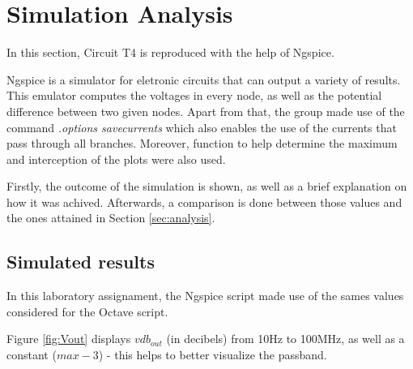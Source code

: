 
\section{Simulation Analysis}
\label{sec:simulation}



In this section, Circuit T4 is reproduced with the help of Ngspice.

Ngspice is a simulator for eletronic circuits that can output a variety of results.
This emulator computes the voltages in every node, as well as the potential difference
between two given nodes. Apart from that, the group made use of the command
{\em .options savecurrents} which also enables the use of the currents that pass
through all branches. Moreover, function to help determine the maximum and interception
of the plots were also used.

Firstly, the outcome of the simulation is shown, as well as a brief explanation
on how it was achived. Afterwards, a comparison is done between those values and
the ones attained in Section \ref{sec:analysis}.




\subsection{Simulated results}
\label{subsec:sim_res}

In this laboratory assignament, the Ngspice script made use of the sames values considered for the Octave script.

Figure \ref{fig:Vout} displays $vdb_{out}$ (in decibels) from 10Hz to 100MHz, as well as a constant ($max-3$) - this helps to better visualize the passband.

